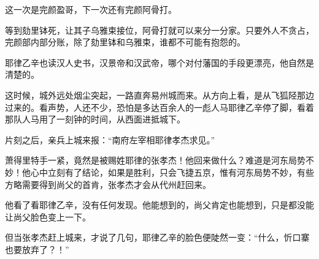 这一次是完颜盈哥，下一次还有完颜阿骨打。

等到劾里钵死，让其子乌雅束接位，阿骨打就可以来分一分家。只要外人不贪占，完颜部内部分账，除了劾里钵和乌雅束，谁都不可能有抱怨的。

耶律乙辛也读汉人史书，汉景帝和汉武帝，哪个对付藩国的手段更漂亮，他自然是清楚的。

这时候，城外远处烟尘突起，一路直奔易州城而来。从方向上看，是从飞狐陉那边过来的。看声势，人还不少，恐怕是多达百余人的一彪人马耶律乙辛停了脚，看着那队人马用了一刻钟的时间，从西面进抵城下。

片刻之后，亲兵上城来报：“南府左宰相耶律孝杰求见。”

萧得里特手一紧，竟然是被赐姓耶律的张孝杰！他回来做什么？难道是河东局势不妙！他心中立刻有了结论，如果是胜利，只会飞捷五京，惟有河东局势不妙，有些方略需要得到尚父的首肯，张孝杰才会从代州赶回来。

他看了看耶律乙辛，没有任何发现。他能想到的，尚父肯定也能想到，只是都没能让尚父脸色变上一下。

但当张孝杰赶上城来，才说了几句，耶律乙辛的脸色便陡然一变：“什么，忻口寨也要放弃了？！”

